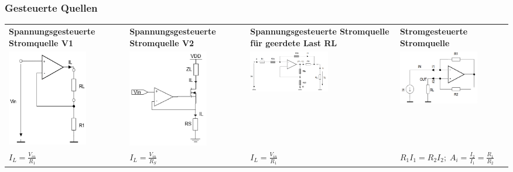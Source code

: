 \documentclass[margin=normal]{tex/hsrzf}
\begin{document}
\endgroup

\subsubsection{Gesteuerte Quellen}
\begingroup
  \small
  \begin{tabularx}{0.8\textwidth}{p{100pt}p{100pt}p{100pt}p{120pt}}
    \textbf{Spannungsgesteuerte \newline Stromquelle V1}                                         &
    \textbf{Spannungsgesteuerte \newline  Stromquelle V2}                                        &
    \textbf{Spannungsgesteuerte \newline Stromquelle \newline
    für geerdete Last RL}                                                                        &
    \textbf{Stromgesteuerte \newline Stromquelle}                                                           \\
    \includegraphics[width = 3.5cm]{img/OpAmp/Spannungsgesteuerte_Stromquelle_V1.png}            &
    \includegraphics[width = 3.5cm]{img/OpAmp/Spannungsgesteuerte_Stromquelle_V2.png}            &
    \includegraphics[width = 3.5cm]{img/OpAmp/Spannungsgesteuerte_Stromquelle_geerdete_Last.png} &
    \includegraphics[width = 3.5cm]{img/OpAmp/Stromgesteuerte_Stromquelle.png}                     \\
    $ I_L = \frac{V_{in}}{R_1} $                                                                 &
    $ I_L = \frac{V_{in}}{R_S} $                                                                 &
    $ I_L = \frac{V_{in}}{R_1} $                                                                 &
    $ R_1I_1=R_2I_2; \; A_i = \frac{I_2}{I_1} = \frac{R_1}{R_2}  $
  \end{tabularx}
\endgroup
\end{document}
